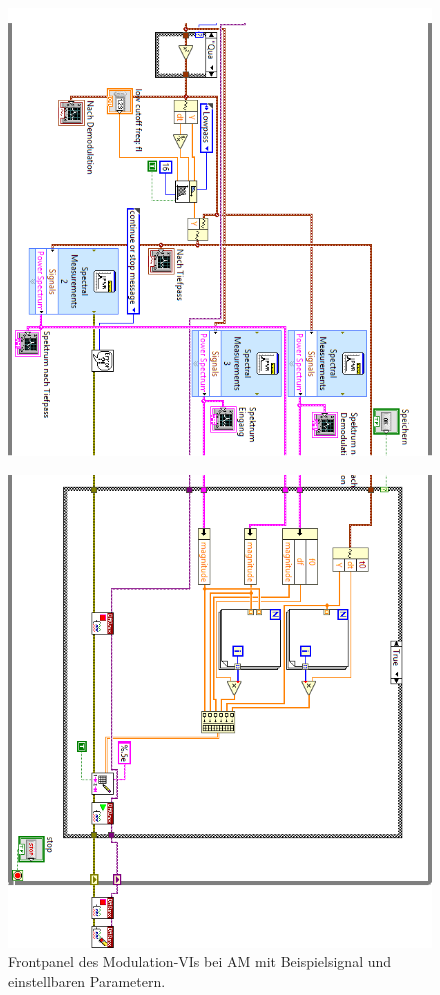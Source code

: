 	\begin{figure}[H]
	\centering
	\includegraphics[width=\textwidth]{pic/messstruktur_dam2.png}
\end{figure} 

\begin{figure}[H]
	\centering
	\includegraphics[width=\textwidth]{pic/messstruktur_dam3.png}
	\caption{Frontpanel des Modulation-VIs bei AM mit Beispielsignal und einstellbaren Parametern.}
	\label{fig:messstruktur_dam}	
\end{figure} 


